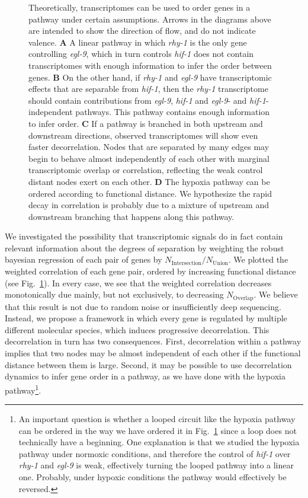 \documentclass[9pt,twocolumn,twoside]{pnas-new}
\newcommand{\gene}[1]{\emph{#1}}
\begin{document}
\begin{figure}[tbhp]
\caption{
Theoretically, transcriptomes can be used to order genes in a pathway under
certain assumptions. Arrows in the diagrams above are intended to show the
direction of flow, and do not indicate valence.
\textbf{A} A linear pathway in which \gene{rhy-1} is the only gene controlling
\gene{egl-9},
which in turn controls \gene{hif-1} does not contain transcriptomes with enough
information to infer the order between genes.
\textbf{B} On the other hand, if \gene{rhy-1} and \gene{egl-9} have transcriptomic
effects that are separable from \gene{hif-1}, then the \gene{rhy-1} transcriptome
should contain contributions from \gene{egl-9}, \gene{hif-1} and \gene{egl-9}- and
\gene{hif-1}-independent pathways. This pathway contains enough information to
infer order.
\textbf{C} If a pathway is branched in both upstream and downstream directions,
observed transcriptomes will show even faster decorrelation. Nodes that are
separated by many edges may begin to behave almost independently of each other
with marginal transcriptomic overlap or correlation, reflecting the weak control
distant nodes exert on each other.
\textbf{D} The hypoxia pathway can be ordered according to functional distance.
We hypothesize the rapid decay in correlation is probably due to a mixture of
upstream and downstream branching that happens along this pathway.
}
\label{fig:decorrelation}
\end{figure}

We investigated the possibility that transcriptomic signals do in fact contain
relevant information about the degrees of separation by weighting the robust
bayesian regression of each pair of genes by
$N_\mathrm{Intersection}/N_{\mathrm{Union}}$. We plotted the weighted
correlation of each gene pair, ordered by increasing functional distance
(see Fig.~\ref{fig:decorrelation}). In every case, we see that the weighted
correlation decreases monotonically due mainly, but not exclusively, to
decreasing $N_\mathrm{Overlap}$.
We believe that this result is not due to random noise or insufficiently deep
sequencing. Instead, we propose a framework in which every gene is regulated
by multiple different molecular species, which induces progressive decorrelation.
This decorrelation in turn has two consequences. First, decorrelation within a
pathway implies that two nodes may be almost independent of each other if the
functional distance between them is large. Second, it may be possible to use
decorrelation dynamics to infer gene order in a pathway, as we have done with
the hypoxia
pathway\footnote{
An important question is whether a looped circuit
like the hypoxia pathway can be ordered in the way we have ordered it in
Fig.~\ref{fig:decorrelation} since a loop does not technically have a beginning.
One explanation is that we studied the hypoxia pathway under normoxic conditions,
and therefore the control of \gene{hif-1} over \gene{rhy-1} and \gene{egl-9} is
weak, effectively turning the looped pathway into a linear one. Probably, under
hypoxic conditions the pathway would effectively be reversed.
}.
\end{document}

